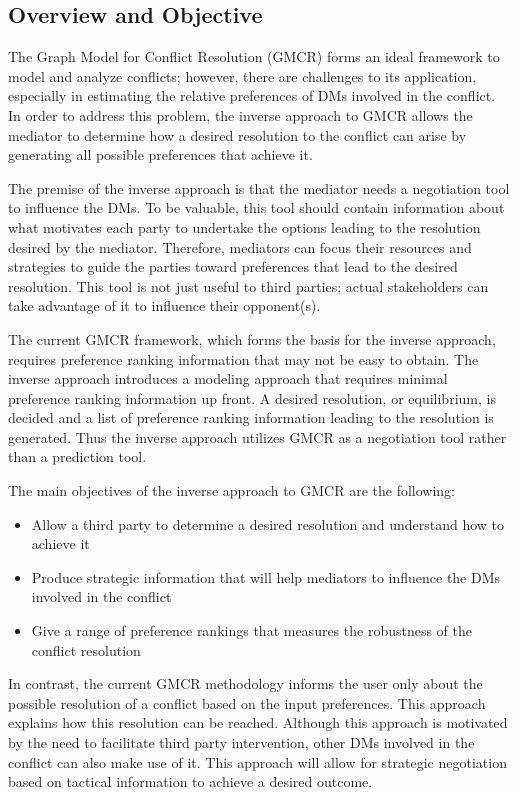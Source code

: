 \documentclass[letterpaper,12pt,titlepage,oneside,final]{book}
\begin{document}
\subsection{Overview and Objective}

The Graph Model for Conflict Resolution (GMCR) forms an ideal framework to model and analyze conflicts; however, there are challenges to its application, especially in estimating the relative preferences of DMs involved in the conflict. In order to address this problem, the inverse approach to GMCR allows the mediator to determine how a desired resolution to the conflict can arise by generating all possible preferences that achieve it.

The premise of the inverse approach is that the mediator needs a negotiation tool to influence the DMs. To be valuable, this tool should contain information about what motivates each party to undertake the options leading to the resolution desired by the mediator. Therefore, mediators can focus their resources and strategies to guide the parties toward preferences that lead to the desired resolution. This tool is not just useful to third parties; actual stakeholders can take advantage of it to influence their opponent(s).

The current GMCR framework, which forms the basis for the inverse approach, requires preference ranking information that may not be easy to obtain. The inverse approach introduces a modeling approach that requires minimal preference ranking information up front. A desired resolution, or equilibrium, is decided and a list of preference ranking information leading to the resolution is generated. Thus the inverse approach utilizes GMCR as a negotiation tool rather than a prediction tool.

The main objectives of the inverse approach to GMCR are the following:
\begin{itemize}
\item Allow a third party to determine a desired resolution and understand how to achieve it
\item Produce strategic information that will help mediators to influence the DMs involved in the conflict
\item Give a range of preference rankings that measures the robustness of the conflict resolution
\end{itemize}

In contrast, the current GMCR methodology informs the user only about the possible resolution of a conflict based on the input preferences. This approach explains how this resolution can be reached. Although this approach is motivated by the need to facilitate third party intervention, other DMs involved in the conflict can also make use of it. This approach will allow for strategic negotiation based on tactical information to achieve a desired outcome.
\end{document}
